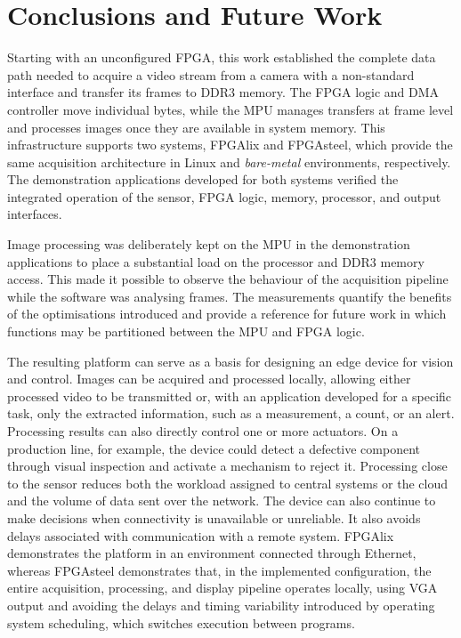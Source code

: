 \section{Conclusions and Future Work}

Starting with an unconfigured FPGA, this work established the complete data path needed to acquire a video stream from a camera with a non-standard interface and transfer its frames to DDR3 memory. The FPGA logic and DMA controller move individual bytes, while the MPU manages transfers at frame level and processes images once they are available in system memory. This infrastructure supports two systems, FPGAlix and FPGAsteel, which provide the same acquisition architecture in Linux and \emph{bare-metal} environments, respectively. The demonstration applications developed for both systems verified the integrated operation of the sensor, FPGA logic, memory, processor, and output interfaces.

Image processing was deliberately kept on the MPU in the demonstration applications to place a substantial load on the processor and DDR3 memory access. This made it possible to observe the behaviour of the acquisition pipeline while the software was analysing frames. The measurements quantify the benefits of the optimisations introduced and provide a reference for future work in which functions may be partitioned between the MPU and FPGA logic.

The resulting platform can serve as a basis for designing an edge device for vision and control. Images can be acquired and processed locally, allowing either processed video to be transmitted or, with an application developed for a specific task, only the extracted information, such as a measurement, a count, or an alert. Processing results can also directly control one or more actuators. On a production line, for example, the device could detect a defective component through visual inspection and activate a mechanism to reject it. Processing close to the sensor reduces both the workload assigned to central systems or the cloud and the volume of data sent over the network. The device can also continue to make decisions when connectivity is unavailable or unreliable. It also avoids delays associated with communication with a remote system. FPGAlix demonstrates the platform in an environment connected through Ethernet, whereas FPGAsteel demonstrates that, in the implemented configuration, the entire acquisition, processing, and display pipeline operates locally, using VGA output and avoiding the delays and timing variability introduced by operating system scheduling, which switches execution between programs.

